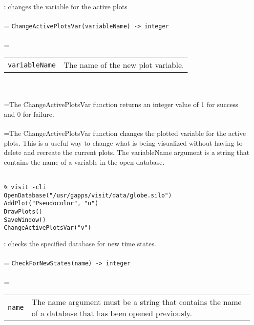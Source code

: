 \documentclass[10pt,a4paper]{report}
\begin{document}
{}
: changes the variable for the active plots\\[-3mm]

 \\ 
\hangindent=\parindent 
\verb!ChangeActivePlotsVar(variableName) -> integer!\\ [-3mm]

 \\ 
\hangindent=\parindent 
\begin{tabular}{ll}
\verb!variableName! & The name of the new plot variable. \\
\end{tabular} \\[-2mm]


 \\ 
\hangindent=\parindent The ChangeActivePlotsVar function returns an integer value of 1 for success and 0 for failure. \\[-3mm] 

 \\ 
\hangindent=\parindent The ChangeActivePlotsVar function changes the plotted variable for the active plots. This is a useful way to change what is being visualized without having to delete and recreate the current plots. The variableName argument is a string that contains the name of a variable in the open database. \\[-3mm] 

\\[-6mm]
\begin{verbatim}% visit -cli
OpenDatabase("/usr/gapps/visit/data/globe.silo")
AddPlot("Pseudocolor", "u")
DrawPlots()
SaveWindow()
ChangeActivePlotsVar("v")
\end{verbatim}
\newpage


{}
: checks the specified database for new time states.\\[-3mm]

 \\ 
\hangindent=\parindent 
\verb!CheckForNewStates(name) -> integer!\\ [-3mm]

 \\ 
\hangindent=\parindent 
\begin{tabular}{lp{9cm}}
\verb!name! & The name argument must be a string that contains the name of a database that has been opened previously. \\
\end{tabular} \\[-2mm]
\end{document}
